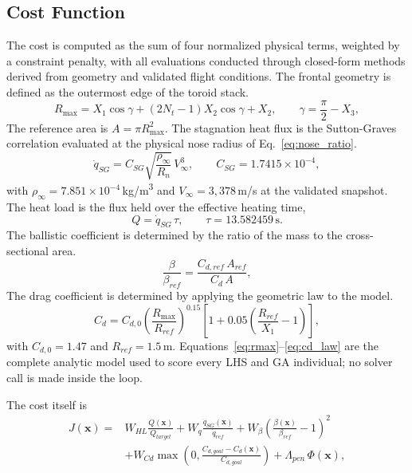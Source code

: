 \subsection{Cost Function}
The cost is computed as the sum of four normalized physical terms, weighted by a constraint penalty, with all evaluations conducted through closed-form methods derived from geometry and validated flight conditions. The frontal geometry is defined as the outermost edge of the toroid stack.
\begin{equation}
    R_{\max} = X_1\cos\gamma + (2N_t-1)X_2\cos\gamma + X_2,
    \qquad \gamma = \frac{\pi}{2} - X_3,
    \label{eq:rmax}
\end{equation}
The reference area is $A=\pi R_{\max}^2$. The stagnation heat flux is the Sutton-Graves correlation evaluated at the physical nose radius of Eq.~\eqref{eq:nose_ratio}.
\begin{equation}
    \dot{q}_{SG} = C_{SG}\sqrt{\frac{\rho_\infty}{R_n}}\,V_\infty^3,
    \qquad C_{SG}=1.7415\times10^{-4},
    \label{eq:sutton_graves}
\end{equation}
with $\rho_\infty=7.851\times10^{-4}$\,kg/m\textsuperscript{3} and $V_\infty=3{,}378$\,m/s at the validated snapshot. The heat load is the flux held over the effective heating time,
\begin{equation}
    Q = \dot{q}_{SG}\,\tau, \qquad \tau = 13.582459\,\text{s}.
    \label{eq:heat_load}
\end{equation}
The ballistic coefficient is determined by the ratio of the mass to the cross-sectional area.
\begin{equation}
    \frac{\beta}{\beta_{ref}} = \frac{C_{d,ref}\,A_{ref}}{C_d\,A},
    \label{eq:beta_ratio}
\end{equation}
The drag coefficient is determined by applying the geometric law to the model.
\begin{equation}
    C_d = C_{d,0}\left(\frac{R_{\max}}{R_{ref}}\right)^{0.15}
          \left[1+0.05\left(\frac{R_{ref}}{X_1}-1\right)\right],
    \label{eq:cd_law}
\end{equation}
with $C_{d,0}=1.47$ and $R_{ref}=1.5$\,m. Equations~\eqref{eq:rmax}--\eqref{eq:cd_law} are the complete analytic model used to score every LHS and GA individual; no solver call is made inside the loop.

The cost itself is
\begin{equation}
\begin{aligned}
    J(\mathbf{x}) = {} & W_{HL}\frac{Q(\mathbf{x})}{Q_{target}} + W_{q}\frac{\dot{q}_{SG}(\mathbf{x})}{\dot{q}_{ref}} + W_{\beta}\left(\frac{\beta(\mathbf{x})}{\beta_{ref}} - 1\right)^{2} \\
    & + W_{Cd}\max\!\left(0, \frac{C_{d,goal} - C_d(\mathbf{x})}{C_{d,goal}}\right) + \Lambda_{pen}\,\Phi(\mathbf{x}),
\end{aligned}
    \label{eq:ga_cost}
\end{equation}

